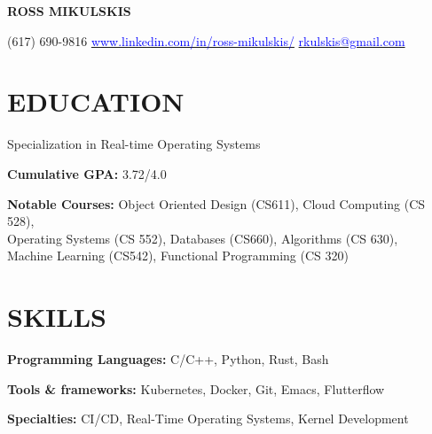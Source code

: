 \documentclass[10pt]{article}
\begin{document}
\begin{FlushLeft}

  \begin{center}
    {\bf ROSS MIKULSKIS}
  \end{center}

  (617) 690-9816 \hfill \hspace{25pt} \href{www.linkedin.com/in/ross-mikulskis/}{\textcolor{blue}{www.linkedin.com/in/ross-mikulskis/}} \hfill \href{mailto:rkulskis@gmail.com}{\textcolor{blue}{rkulskis@gmail.com}}
  \section{EDUCATION}
  \vspace{1.5em}
  \begin{itemize}{
      \item Specialization in Real-time Operating Systems
    }
  \end{itemize}
  
  \begin{itemize}{
    \item \textbf{Cumulative GPA:} 3.72/4.0
    \item \textbf{Notable Courses:} Object Oriented Design (CS611), Cloud Computing (CS 528), \\
      Operating Systems (CS 552), Databases (CS660), Algorithms (CS 630), \\
      Machine Learning (CS542), Functional Programming (CS 320)
    }
  \end{itemize}


  \section{SKILLS}
  \vspace{-0.75em}
  \begin{itemize}{
    \item {\bf Programming Languages:} C/C++, Python, Rust, Bash
    \item {\bf Tools \& frameworks:} Kubernetes, Docker, Git, Emacs, Flutterflow
    \item {\bf Specialties:} CI/CD, Real-Time Operating Systems, Kernel Development
    }
  \end{itemize}


\end{FlushLeft}
\end{document}
